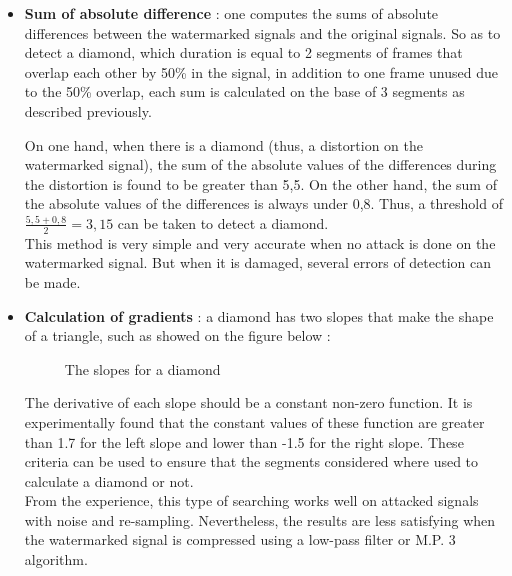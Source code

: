 \begin{itemize}
\item \textbf{Sum of absolute difference} : one computes the sums of absolute differences between the watermarked signals and the original signals. So as to detect a diamond, which duration is equal to 2 segments of frames that overlap each other by 50\% in the signal, in addition to one frame unused due to the 50\% overlap, each sum is calculated on the base of 3 segments as described previously. 

On one hand, when there is a diamond (thus, a distortion on the watermarked signal), the sum of the absolute values of the differences during the distortion is found to be greater than 5,5. On the other hand, the sum of the absolute values of the differences is always under 0,8. Thus, a threshold of $\frac{5,5 + 0,8}{2} = 3,15$ can be taken to detect a diamond.\\
This method is very simple and very accurate when no attack is done on the watermarked signal. But when it is damaged, several errors of detection can be made.
\item \textbf{Calculation of gradients} : a diamond has two slopes that make the shape of a triangle, such as showed on the figure below :
\begin{figure}[H]
\caption{\label{slopes} The slopes for a diamond}
\end{figure}
The derivative of each slope should be a constant non-zero function. It is experimentally found that the constant values of these function are greater than 1.7 for the left slope and lower than -1.5 for the right slope. These criteria can be used to ensure that the segments considered where used to calculate a diamond or not.\\
From the experience, this type of searching works well on attacked signals with noise and re-sampling. Nevertheless, the results are less satisfying when the watermarked signal is compressed using a low-pass filter or M.P. 3 algorithm.

\end{itemize}

